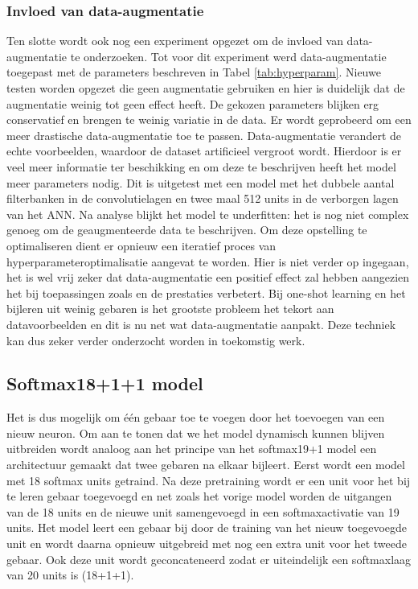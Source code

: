 \subsubsection{Invloed van data-augmentatie}
Ten slotte wordt ook nog een experiment opgezet om de invloed van data-augmentatie te onderzoeken. Tot voor dit experiment werd data-augmentatie toegepast met de parameters beschreven in Tabel \ref{tab:hyperparam}. Nieuwe testen worden opgezet die geen augmentatie gebruiken en hier is duidelijk dat de augmentatie weinig tot geen effect heeft. De gekozen parameters blijken erg conservatief en brengen te weinig variatie in de data. Er wordt geprobeerd om een meer drastische data-augmentatie toe te passen. Data-augmentatie verandert de echte voorbeelden, waardoor de dataset artificieel vergroot wordt. Hierdoor is er veel meer informatie ter beschikking en om deze te  beschrijven heeft het model meer parameters nodig.
\npar Dit is uitgetest met een model met het dubbele aantal filterbanken in de convolutielagen en twee maal 512 units in de verborgen lagen van het ANN. Na analyse blijkt het model te underfitten: het is nog niet complex genoeg om de geaugmenteerde data te beschrijven. Om deze opstelling te optimaliseren dient er opnieuw een iteratief proces van hyperparameteroptimalisatie aangevat te worden. Hier is niet verder op ingegaan, het is wel vrij zeker dat data-augmentatie een positief effect zal hebben aangezien het bij toepassingen zoals  \cite{cnn-krizhevsky} en \cite{cnn-karpathy} de prestaties verbetert. Bij one-shot learning en het bijleren uit weinig gebaren is het grootste probleem het tekort aan datavoorbeelden en dit is nu net wat data-augmentatie aanpakt. Deze techniek kan dus zeker verder onderzocht worden in toekomstig werk.

\subsection{Softmax18+1+1 model}\label{sec:softmax18x2}
Het is dus mogelijk om \'e\'en gebaar toe te voegen door het toevoegen van een nieuw neuron. Om aan te tonen dat we het model dynamisch kunnen blijven uitbreiden wordt analoog aan het principe van het softmax19+1 model een architectuur gemaakt dat twee gebaren na elkaar bijleert. Eerst wordt een model met 18 softmax units getraind. Na deze pretraining wordt er een unit voor het bij te leren gebaar toegevoegd en net zoals het vorige model worden de uitgangen van de 18 units en de nieuwe unit samengevoegd in een softmaxactivatie van 19 units.
\npar Het model leert een gebaar bij door de training van het nieuw toegevoegde unit en wordt daarna opnieuw uitgebreid met nog een extra unit voor het tweede gebaar. Ook deze unit wordt geconcateneerd zodat er uiteindelijk een softmaxlaag van 20 units is (18+1+1).

